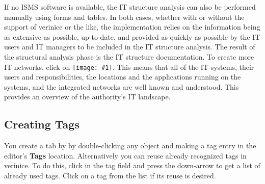 \documentclass[a4paper,10pt]{book}
\newcommand{\icon}[1]{\texttt{[image: \#1]}}
\begin{document}
If no ISMS software is available, the IT structure analysis can also be performed manually using forms and tables. In both cases, whether with or without the support of verinice or the like, the implementation relies on the information being as extensive as possible, up-to-date, and provided as quickly as possible by the IT users and IT managers to be included in the IT structure analysis.
\newline
The result of the structural analysis phase is the IT structure documentation. \newline
To create more IT networks, click on  \icon{Icon/Oeffnen.png}.
This means that all of the IT systems, their users and responsibilities, the locations and the applications running on the systems, and the integrated networks are well known and understood. This provides an overview of the authority's IT landscape.

\subsection{Creating Tags}
You create a tab by by double-clicking any object and making a tag entry in the editor's \textbf{Tags} location. Alternatively you can reuse already recognized tags in verinice. To do this, click in the tag field and press the down-arrow to get a list of already used tags. Click on a tag from the list if its reuse is desired.
\end{document}
